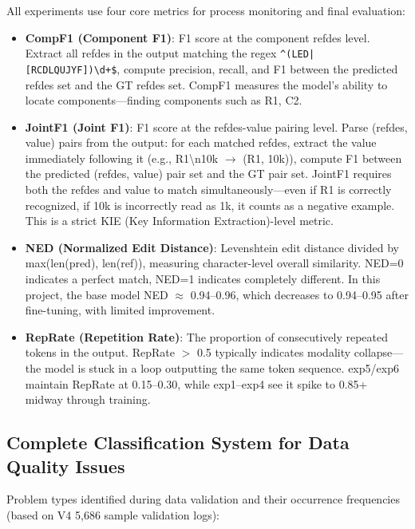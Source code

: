 All experiments use four core metrics for process monitoring and final evaluation:

\begin{itemize}[nosep]
    \item \textbf{CompF1 (Component F1)}: F1 score at the component refdes level. Extract all refdes in the output matching the regex \texttt{\^{}(LED|[RCDLQUJYF])\textbackslash d+\$}, compute precision, recall, and F1 between the predicted refdes set and the GT refdes set. CompF1 measures the model's ability to locate components---finding components such as R1, C2.
    \item \textbf{JointF1 (Joint F1)}: F1 score at the refdes-value pairing level. Parse (refdes, value) pairs from the output: for each matched refdes, extract the value immediately following it (e.g., R1\textbackslash n10k $\to$ (R1, 10k)), compute F1 between the predicted (refdes, value) pair set and the GT pair set. JointF1 requires both the refdes and value to match simultaneously---even if R1 is correctly recognized, if 10k is incorrectly read as 1k, it counts as a negative example. This is a strict KIE (Key Information Extraction)-level metric.
    \item \textbf{NED (Normalized Edit Distance)}: Levenshtein edit distance divided by max(len(pred), len(ref)), measuring character-level overall similarity. NED=0 indicates a perfect match, NED=1 indicates completely different. In this project, the base model NED $\approx$ 0.94--0.96, which decreases to 0.94--0.95 after fine-tuning, with limited improvement.
    \item \textbf{RepRate (Repetition Rate)}: The proportion of consecutively repeated tokens in the output. RepRate $>$ 0.5 typically indicates modality collapse---the model is stuck in a loop outputting the same token sequence. exp5/exp6 maintain RepRate at 0.15--0.30, while exp1--exp4 see it spike to 0.85+ midway through training.
\end{itemize}

\subsection{Complete Classification System for Data Quality Issues}

Problem types identified during data validation and their occurrence frequencies (based on V4 5,686 sample validation logs):

